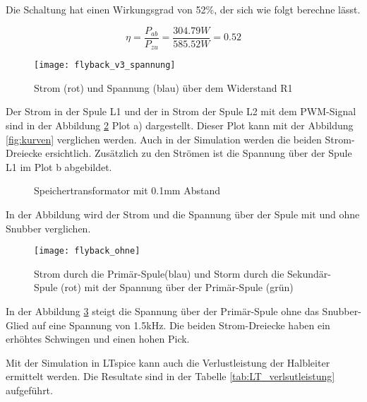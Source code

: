 Die Schaltung hat einen Wirkungsgrad von 52\%, der sich wie folgt berechne lässt. 

\begin{equation}\label{eq:wirkungsgrand}
\eta=\frac{P_{ab}}{P_{zu}}=\frac{304.79W}{585.52W} = 0.52
\end{equation}

\begin{figure}[H]
	\centering
	\texttt{[image: flyback\_v3\_spannung]}
	\caption{Strom (rot) und Spannung (blau) über dem Widerstand R1 }\label{fig:ausgangsstrom}
\end{figure}

Der Strom in der Spule L1 und der in Strom der Spule L2 mit dem PWM-Signal sind in der Abbildung \ref{fig:spule} Plot a) dargestellt. Dieser Plot kann mit der Abbildung \ref{fig:kurven} verglichen werden. Auch in der Simulation werden die beiden Strom-Dreiecke ersichtlich. Zusätzlich zu den Strömen ist die Spannung über der Spule L1  im Plot b abgebildet.

\begin{figure}[H]
	\centering
	\qquad
	\caption{Speichertransformator mit 0.1mm Abstand}
	\label{fig:spule}
\end{figure}

In der Abbildung wird der Strom und die Spannung über der Spule mit und ohne Snubber verglichen.

\begin{figure}[H]
	\centering
	\texttt{[image: flyback\_ohne]}
	\caption{Strom durch die Primär-Spule(blau) und Storm durch die Sekundär-Spule (rot) mit der Spannung über der Primär-Spule (grün) }\label{fig:LT_snubber}
\end{figure}

In der Abbildung \ref{fig:LT_snubber} steigt die Spannung über der Primär-Spule ohne das Snubber-Glied auf eine Spannung von 1.5kHz. Die beiden Strom-Dreiecke haben ein erhöhtes Schwingen und einen hohen Pick. 

Mit der Simulation in LTspice kann auch die Verlustleistung der Halbleiter ermittelt werden. Die Resultate sind in der Tabelle \ref{tab:LT_verlsutleistung} aufgeführt.

